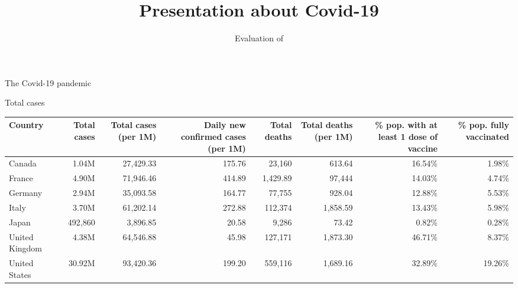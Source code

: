 \documentclass{beamer}
\title{Presentation about Covid-19}
\subtitle{Evaluation of \iLaTeX{}}
\date{}
\begin{document}
\maketitle







%
%
\begin{frame}{The Covid-19 pandemic}
\end{frame}





%
%
\begin{frame}{Total cases}

	\begin{tabular}{lrrrrrrr}
    \toprule
    Country & Total cases & Total cases (per 1M) & Daily new confirmed cases (per 1M) & Total deaths & Total deaths (per 1M) & \% pop. with at least 1 dose of vaccine & \% pop. fully vaccinated \\
    \midrule
    Canada & 1.04M & 27,429.33 & 175.76 & 23,160 & 613.64 & 16.54\% & 1.98\% \\
    France & 4.90M & 71,946.46 & 414.89 & 1,429.89 & 97,444 & 14.03\% & 4.74\% \\
    Germany & 2.94M & 35,093.58 & 164.77 & 77,755 & 928.04 & 12.88\% & 5.53\% \\
    Italy & 3.70M & 61,202.14 & 272.88 & 112,374 & 1,858.59 & 13.43\% & 5.98\% \\
    Japan & 492,860 & 3,896.85 & 20.58 & 9,286 & 73.42 & 0.82\% & 0.28\% \\
    United Kingdom & 4.38M & 64,546.88 & 45.98 & 127,171 & 1,873.30 & 46.71\% & 8.37\% \\
    United States & 30.92M & 93,420.36 & 199.20 & 559,116 & 1,689.16 & 32.89\% & 19.26\% \\
    \bottomrule
	\end{tabular}
\end{frame}
\end{document}
